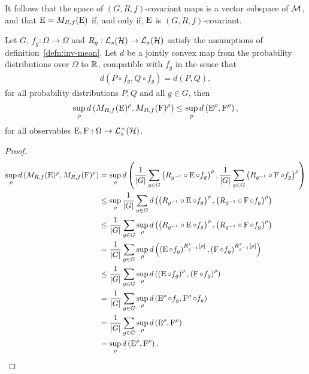 It follows that the space of $(G, R,f)$-covariant maps is a vector subspace of $\mathcal{M}$, and that $\operatorname{E}=M_{R,f}(\operatorname{E})$ if, and only if, $\operatorname{E}$ is $(G, R,f)$-covariant.

\begin{thm}
  \label{thm:inv-mean-reduces-error}
  Let $G$, $f_g:\Omega\to\Omega$ and $R_g:\saops[\hcal]\to\saops[\hcal]$ satisfy the assumptions of definition~\ref{defn:inv-mean}. Let $d$ be a jointly convex map from the probability distributions over $\Omega$ to $\mathbb{R}$, compatible with $f_g$ in the sense that
  \begin{align}\label{eqn:group-rep-error-compat}
    d(P\circ f_g, Q\circ f_g) = d(P,Q),
  \end{align}
  for all probability distributions $P,Q$ and all $g\in G$, then
  \begin{align}
    \sup_\rho d\left(M_{R,f}(\operatorname{E})^\rho, M_{R,f}(\operatorname{F})^\rho\right) \leq \sup_\rho d\left(\operatorname{E}^\rho,\operatorname{F}^\rho\right),
  \end{align}
  for all observables $\ope, \opf:\Omega\to\posops[\hcal]$.
  \begin{proof}
    \begin{align}
      \sup_\rho d\left(M_{R,f}(\operatorname{E})^\rho, M_{R,f}(\operatorname{F})^\rho\right) &= \sup_\rho d\left( \frac{1}{{\left\lvert{G}\right\rvert}}\sum_{g\in G} \left(R_{g^{-1}} \circ \operatorname{E}\circ f_g\right)^\rho , \frac{1}{{\left\lvert{G}\right\rvert}}\sum_{g\in G}\left(R_{g^{-1}} \circ \operatorname{F}\circ f_g\right)^\rho \right)\\
                                                                     &\leq \sup_\rho \frac{1}{{\left\lvert{G}\right\rvert}}\sum_{g\in G} d\left( \left(R_{g^{-1}} \circ \operatorname{E}\circ f_g\right)^\rho ,\left(R_{g^{-1}} \circ \operatorname{F}\circ f_g\right)^\rho \right)\\
                                                                     &\leq \frac{1}{{\left\lvert{G}\right\rvert}}\sum_{g\in G}\sup_\rho d\left( \left(R_{g^{-1}} \circ \operatorname{E}\circ f_g\right)^\rho ,\left(R_{g^{-1}} \circ \operatorname{F}\circ f_g\right)^\rho \right)\\
                                                                     &= \frac{1}{{\left\lvert{G}\right\rvert}}\sum_{g\in G}\sup_\rho d\left( \left( \operatorname{E}\circ f_g\right)^{R_{g^{-1}}^*[\rho]} ,\left(\operatorname{F}\circ f_g\right)^{R_{g^{-1}}^*[\rho]} \right)\\
                                                                     &\leq \frac{1}{{\left\lvert{G}\right\rvert}}\sum_{g\in G}\sup_\rho d\left( \left( \operatorname{E}\circ f_g\right)^{\rho} ,\left(\operatorname{F}\circ f_g\right)^{\rho} \right)\\
                                                                     &= \frac{1}{{\left\lvert{G}\right\rvert}}\sum_{g\in G}\sup_\rho d\left( \operatorname{E}^{\rho}\circ f_g , \operatorname{F}^{\rho}\circ f_g \right)\\
                                                                     &= \frac{1}{{\left\lvert{G}\right\rvert}}\sum_{g\in G}\sup_\rho d\left(\operatorname{E}^{\rho} ,\operatorname{F}^{\rho}\right)\\
                                                                     &= \sup_\rho d\left(\operatorname{E}^{\rho} ,\operatorname{F}^{\rho}\right).
    \end{align}
  \end{proof}
\end{thm}
